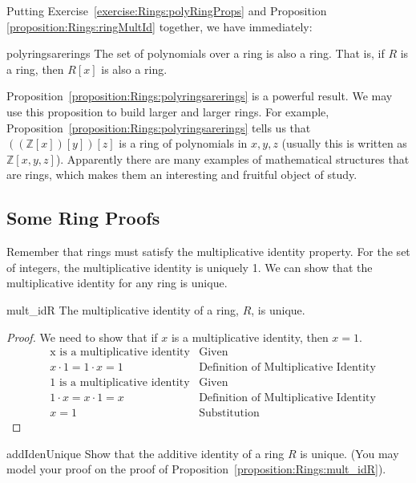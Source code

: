 Putting Exercise~\ref{exercise:Rings:polyRingProps} and Proposition \ref{proposition:Rings:ringMultId} together, we have immediately:

\begin{prop}{polyringsarerings} The set of polynomials over a ring is also a ring. That is, if $R$ is a ring, then $R[x]$ is also a ring.
\end{prop}

Proposition~\ref{proposition:Rings:polyringsarerings} is a powerful result. We may use this proposition to build larger and larger rings. For example, Proposition~\ref{proposition:Rings:polyringsarerings} tells us that $((\mathbb{Z}[x])[y])[z]$ is a ring of polynomials in $x,y,z$  (usually this is written as $\mathbb{Z}[x,y,z]$). Apparently there are many examples of mathematical structures that are rings, which makes them an interesting and fruitful object of study.



\subsection{Some Ring Proofs}
\label{subsec:Rings:DefinitionsAndExamples:RingProofs}

Remember that rings must satisfy the multiplicative identity property. For the set of integers, the multiplicative identity is uniquely 1. We can show that the multiplicative identity for any ring is unique.

\begin{prop}{mult_idR}
The multiplicative identity of a ring, $R$, is unique.\\

\begin{proof}
We need to show that if $x$ is a multiplicative identity, then $x=1$.
\begin{align*}
&\text{x is a multiplicative identity} & \text{Given}\\
&x\cdot1=1\cdot x=1 & \text{Definition of Multiplicative Identity}\\
&\text{1 is a multiplicative identity} & \text{Given}\\  
&1\cdot x=x\cdot1=x & \text{Definition of Multiplicative Identity} \\
&x=1 & \text{Substitution}
\end{align*}
\end{proof}
\end{prop}

\begin{exercise}{addIdenUnique}
Show that the additive identity of a ring $R$ is unique.  (You may model your proof on the proof of Proposition~\ref{proposition:Rings:mult_idR}).
\end{exercise}

